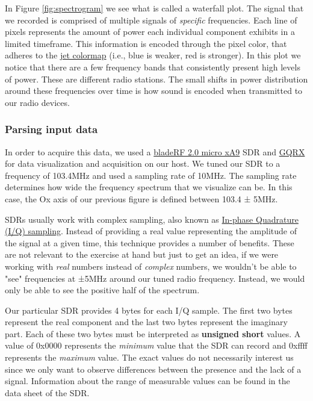 In Figure \ref{fig:spectrogram} we see what is called a waterfall plot. The
signal that we recorded is comprised of multiple signals of \textit{specific}
frequencies. Each line of pixels represents the amount of power each individual
component exhibits in a limited timeframe. This information is encoded through
the pixel color, that adheres to the
\href{https://www.mathworks.com/help/matlab/ref/jet.html}{jet colormap} (i.e.,
blue is weaker, red is stronger). In this plot we notice that there are a few
frequency bands that consistently present high levels of power. These are
different radio stations. The small shifts in power distribution around these
frequencies over time is how sound is encoded when transmitted to our radio
devices.

\subsubsection{Parsing input data}

In order to acquire this data, we used a
\href{https://www.nuand.com/product/bladerf-xa9/}{bladeRF 2.0 micro xA9} SDR
and \href{https://www.gqrx.dk/}{GQRX} for data visualization and acquisition on
our host. We tuned our SDR to a frequency of 103.4MHz and used a sampling rate
of 10MHz. The sampling rate determines how wide the frequency spectrum that
we visualize can be. In this case, the Ox axis of our previous figure is defined
between 103.4 ± 5MHz.

SDRs usually work with complex sampling, also known as
\href{https://pysdr.org/content/sampling.html}{In-phase Quadrature (I/Q)
sampling}. Instead of providing a real value representing the amplitude of the
signal at a given time, this technique provides a number of benefits. These are
not relevant to the exercise at hand but just to get an idea, if we were working
with \textit{real} numbers instead of \textit{complex} numbers, we wouldn't be
able to "see" frequencies at ±5MHz around our tuned radio frequency. Instead,
we would only be able to see the positive half of the spectrum.

Our particular SDR provides 4 bytes for each I/Q sample. The first two bytes
represent the real component and the last two bytes represent the imaginary
part. Each of these two bytes must be interpreted as \textbf{unsigned short}
values. A value of 0x0000 represents the \textit{minimum} value that the SDR
can record and 0xffff represents the \textit{maximum} value. The exact values
do not necessarily interest us since we only want to observe differences between
the presence and the lack of a signal. Information about the range of measurable
values can be found in the data sheet of the SDR.


